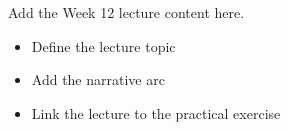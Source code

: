 Add the Week 12 lecture content here.

\begin{itemize}
  \item Define the lecture topic
  \item Add the narrative arc
  \item Link the lecture to the practical exercise
\end{itemize}
